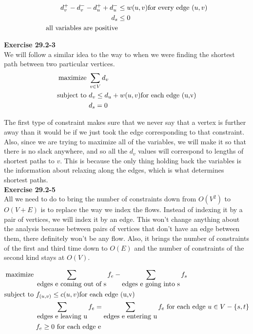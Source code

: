 \documentclass{article}
\begin{document}
\begin{align*}
d_v^+- d_v^- - d_u^+ +d_u^- &\le w(u,v) \hbox{for every edge $(u,v)$}\\
d_s &\le 0\\
\hbox{all variables are positive}
\end{align*}

\noindent\textbf{Exercise 29.2-3}\\
We will follow a similar idea to the way to when we were finding the shortest path between two particular vertices.
\begin{align*}
\hbox{maximize }&\sum_{v\in V} d_v\\
\hbox{subject to }& d_v\le d_u + w(u,v) \hbox{for each edge (u,v)}\\
&d_s =0
\end{align*}

The first type of constraint makes sure that we never say that a vertex is further away than it would be if we just took the edge corresponding to that constraint. Also, since we are trying to maximize all of the variables, we will make it so that there is no slack anywhere, and so all the $d_v$ values will correspond to lengths of shortest paths to $v$. This is because the only thing holding back the variables is the information about relaxing along the edges, which is what determines shortest paths.\\

\noindent\textbf{Exercise 29.2-5}\\
All we need to do to bring the number of constraints down from $O(V^2)$ to $O(V+E)$ is to replace the way we index the flows. Instead of indexing it by a pair of vertices, we will index it by an edge. This won't change anything about the analysis because between pairs of vertices that don't have an edge between them, there definitely won't be any flow. Also, it brings the number of constraints of the first and third time down to $O(E)$ and the number of constraints of the second kind stays at $O(V)$.

\begin{align*}
\hbox{maximize }&\sum_{\hbox{edges e coming out of s}} f_e - \sum_{\hbox{edges e going into s}} f_s\\
\hbox{subject to }& f_{(u,v)}\le c(u,v)\hbox{for each edge (u,v)}\\
& \sum_{\hbox{edges e leaving u}} f_e = \sum_{\hbox{edges e entering u}} f_e \hbox{  for each edge $u \in V-\{s,t\}$}\\
&f_e \ge 0 \hbox{  for each edge e}
\end{align*}
\end{document}
